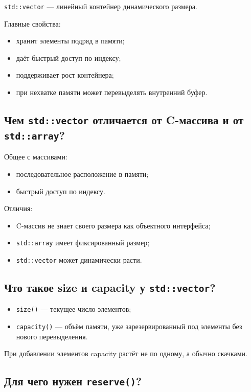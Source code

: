 \texttt{std::vector} --- линейный контейнер динамического размера.

Главные свойства:
\begin{itemize}
    \item хранит элементы подряд в памяти;
    \item даёт быстрый доступ по индексу;
    \item поддерживает рост контейнера;
    \item при нехватке памяти может перевыделять внутренний буфер.
\end{itemize}


\subsection{Чем \texttt{std::vector} отличается от C-массива и от \texttt{std::array}?}

Общее с массивами:
\begin{itemize}
    \item последовательное расположение в памяти;
    \item быстрый доступ по индексу.
\end{itemize}

Отличия:
\begin{itemize}
    \item C-массив не знает своего размера как объектного интерфейса;
    \item \texttt{std::array} имеет фиксированный размер;
    \item \texttt{std::vector} может динамически расти.
\end{itemize}


\subsection{Что такое size и capacity у \texttt{std::vector}?}

\begin{itemize}
    \item \texttt{size()} --- текущее число элементов;
    \item \texttt{capacity()} --- объём памяти, уже зарезервированный под элементы без нового перевыделения.
\end{itemize}

При добавлении элементов capacity растёт не по одному, а обычно скачками.


\subsection{Для чего нужен \texttt{reserve()}?}


